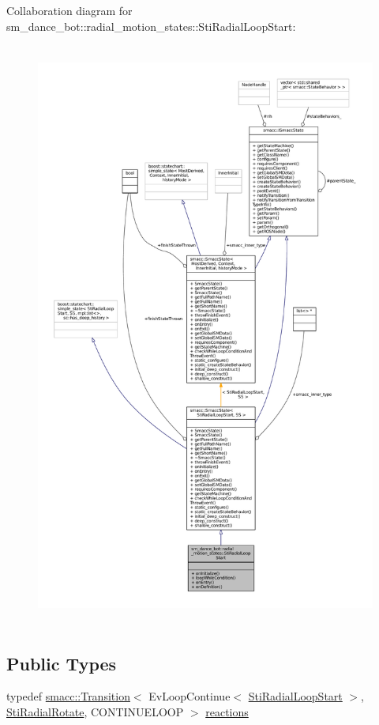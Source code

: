 Collaboration diagram for sm\+\_\+dance\+\_\+bot\+:\+:radial\+\_\+motion\+\_\+states\+:\+:Sti\+Radial\+Loop\+Start\+:
\nopagebreak
\begin{figure}[H]
\begin{center}
\leavevmode
\includegraphics[height=550pt]{structsm__dance__bot_1_1radial__motion__states_1_1StiRadialLoopStart__coll__graph}
\end{center}
\end{figure}
\subsection*{Public Types}
\begin{DoxyCompactItemize}
\item 
typedef \hyperlink{classsmacc_1_1Transition}{smacc\+::\+Transition}$<$ Ev\+Loop\+Continue$<$ \hyperlink{structsm__dance__bot_1_1radial__motion__states_1_1StiRadialLoopStart}{Sti\+Radial\+Loop\+Start} $>$, \hyperlink{structsm__dance__bot_1_1radial__motion__states_1_1StiRadialRotate}{Sti\+Radial\+Rotate}, C\+O\+N\+T\+I\+N\+U\+E\+L\+O\+OP $>$ \hyperlink{structsm__dance__bot_1_1radial__motion__states_1_1StiRadialLoopStart_ab5032169a6e6383ea8c9611fd5f54da4}{reactions}
\end{DoxyCompactItemize}
